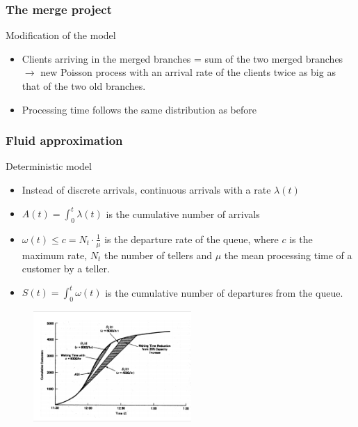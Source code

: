 \documentclass[10pt]{beamer}
\begin{document}
\begin{frame}
  \frametitle{The merge project}
  \begin{block}{Modification of the model}
  \begin{itemize}
  \item  Clients arriving in the merged branches = sum of the two merged branches
  $\rightarrow $ new Poisson process with an arrival rate of the clients twice as big as that of the two old branches.
  \item Processing time follows the same distribution as before
  \end{itemize}
  \end{block}
 
\end{frame}


\begin{frame}
\frametitle{Fluid approximation}
\begin{block}{Deterministic model}
\begin{itemize}
\item Instead of discrete arrivals, continuous arrivals with a rate $\lambda(t)$
\item $A(t) = \int_0^t \lambda(t)$ is the cumulative number of arrivals
\item $\omega (t) \leq c = N_t \cdot \frac{1}{\mu}$ is the departure rate of the queue, where $c$ is the maximum rate, $N_t$ the number of tellers and $\mu$ the mean processing time of a customer by a teller.
\item $S(t) = \int_0^t \omega(t)$ is the cumulative number of departures from the queue.
\end{itemize}
\end{block}
\begin{figure}
\centering
\includegraphics[width = 6cm]{fluid_approx.png}
\end{figure}
\end{frame}
\end{document}
